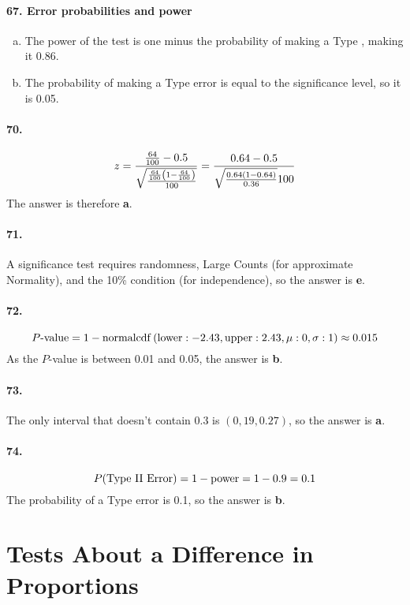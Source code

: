 			\paragraph{67. Error probabilities and power}
				\begin{enumerate}[a.]
					\item 
						The power of the test is one minus the probability of making a Type , making it 0.86.
					\item 
						The probability of making a Type  error is equal to the significance level, so it is 0.05.
				\end{enumerate}
			\paragraph{70.}
				$$z = \frac{\frac{64}{100} - 0.5}{\sqrt{\frac{\frac{64}{100}\left(1 - \frac{64}{100}\right)}{100}}} = \frac{0.64 - 0.5}{\sqrt{\frac{0.64\left(1 - 0.64\right)}{0.36}}{100}}$$
				The answer is therefore \textbf{a}.
			\paragraph{71.}
				A significance test requires randomness, Large Counts (for approximate Normality), and the 10\% condition (for independence), so the answer is \textbf{e}.
			\paragraph{72.}
				$$P\text{-value} = 1 - \operatorname{normalcdf}\left(\operatorname{lower}: -2.43, \operatorname{upper}: 2.43, \mu: 0, \sigma: 1\right) \approx 0.015$$
				As the $P$-value is between 0.01 and 0.05, the answer is \textbf{b}.
			\paragraph{73.}
				The only interval that doesn't contain 0.3 is $(0,19, 0.27)$, so the answer is \textbf{a}.
			\paragraph{74.}
				$$P(\text{Type \Roman{2} Error}) = 1 - \mathrm{power} = 1 - 0.9 = 0.1$$
				The probability of a Type  error is 0.1, so the answer is \textbf{b}.
		\section{Tests About a Difference in Proportions}
